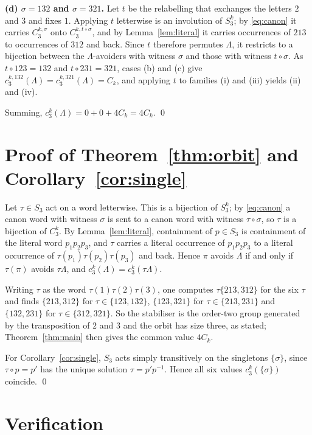 \documentclass[11pt]{amsart}
\theoremstyle{definition}
\newcommand{\Cat}{C}
\begin{document}
\smallskip\noindent
\textbf{(d) $\sigma=132$ and $\sigma=321$.}
Let $t$ be the relabelling that exchanges the letters $2$ and $3$ and fixes
$1$. Applying $t$ letterwise is an involution of $S_3^k$; by \eqref{eq:canon}
it carries $C_3^{k,\sigma}$ onto $C_3^{k,t\circ\sigma}$, and by
Lemma~\ref{lem:literal} it carries occurrences of $213$ to occurrences of $312$
and back. Since $t$ therefore permutes $\Lambda$, it restricts to a bijection
between the $\Lambda$-avoiders with witness $\sigma$ and those with witness
$t\circ\sigma$. As $t\circ 123=132$ and $t\circ 231=321$, cases (b) and (c)
give $c_3^{k,132}(\Lambda)=c_3^{k,321}(\Lambda)=\Cat_k$, and applying $t$ to
families (i) and (iii) yields (ii) and (iv).

\smallskip\noindent
Summing, $c_3^k(\Lambda)=0+0+4\Cat_k=4\Cat_k$. \qed

\section{Proof of Theorem~\ref{thm:orbit} and Corollary~\ref{cor:single}}

Let $\tau\in S_3$ act on a word letterwise. This is a bijection of $S_3^k$; by
\eqref{eq:canon} a canon word with witness $\sigma$ is sent to a canon word
with witness $\tau\circ\sigma$, so $\tau$ is a bijection of $C_3^k$. By
Lemma~\ref{lem:literal}, containment of $p\in S_3$ is containment of the
literal word $p_1p_2p_3$, and $\tau$ carries a literal occurrence of
$p_1p_2p_3$ to a literal occurrence of $\tau(p_1)\tau(p_2)\tau(p_3)$ and back.
Hence $\pi$ avoids $\Lambda$ if and only if $\tau(\pi)$ avoids $\tau\Lambda$,
and $c_3^k(\Lambda)=c_3^k(\tau\Lambda)$.

Writing $\tau$ as the word $\tau(1)\tau(2)\tau(3)$, one computes
$\tau\{213,312\}$ for the six $\tau$ and finds $\{213,312\}$ for
$\tau\in\{123,132\}$, $\{123,321\}$ for $\tau\in\{213,231\}$ and
$\{132,231\}$ for $\tau\in\{312,321\}$. So the stabiliser is the order-two
group generated by the transposition of $2$ and $3$ and the orbit has size
three, as stated; Theorem~\ref{thm:main} then gives the common value $4\Cat_k$.

For Corollary~\ref{cor:single}, $S_3$ acts simply transitively on the
singletons $\{\sigma\}$, since $\tau\circ p=p'$ has the unique solution
$\tau=p'p^{-1}$. Hence all six values $c_3^k(\{\sigma\})$ coincide. \qed

\section{Verification}
\end{document}
